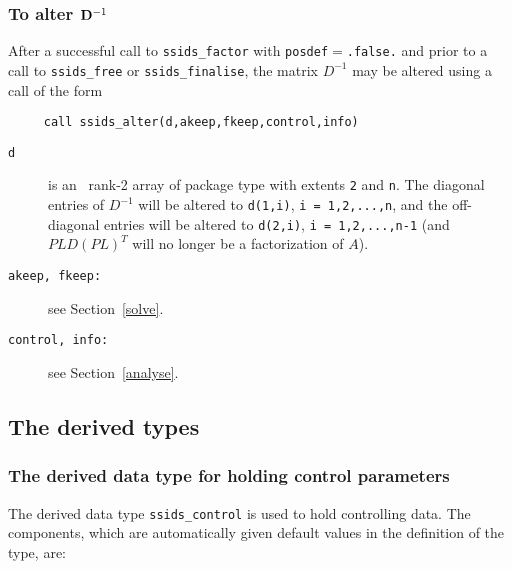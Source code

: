\documentclass{spral}
\begin{document}

\subsubsection{To alter ${\bf D}^{-1}$}

After a successful call to {\tt ssids\_factor} with
{\tt posdef}$=${\tt .false.} and prior to
a call to {\tt ssids\_free} or {\tt ssids\_finalise},
the matrix ${D}^{-1}$ may be altered  using a call of the form
\begin{verbatim}
     call ssids_alter(d,akeep,fkeep,control,info)
\end{verbatim}

\vspace*{-3mm}
\begin{description}

\item[\texttt{d}] is an \intentin\ rank-2  array of package type with
extents {\tt 2}  and {\tt n}. The diagonal entries
of ${D}^{-1}$ will be altered to {\tt d(1,i)}, {\tt i = 1,2,...,n},
and the off-diagonal entries will be altered to
{\tt d(2,i)}, {\tt i = 1,2,...,n-1} (and $PLD(PL)^T$ will no longer be
a factorization of $A$).

\item[\texttt{akeep{\rm ,} fkeep{\rm :}}]  see Section~\ref{solve}.

\item[\texttt{control{\rm ,} info{\rm :}}]  see Section~\ref{analyse}.
\end{description}


\subsection{The derived types}
\subsubsection{The derived data type for holding control parameters}
\label{typecontrol}

The derived data type {\tt ssids\_control}
is used to hold controlling data. The components, which are automatically
given default values in the definition of the type, are: \\

\end{document}
